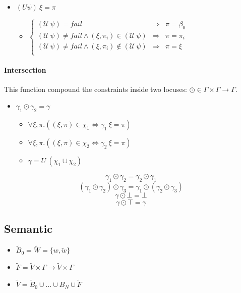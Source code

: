 \documentclass[a4paper]{report}
\newcommand{\locus}[1]{\widetilde{#1}}
\begin{document}
\begin{itemize}
\item $(U \psi)\ \xi = \pi$
	\begin{itemize}
	\item $\left\{\begin{array}{ccl}
	 	(\mathcal U\ \psi) = fail & \Rightarrow& \pi =\beta_0\\
		(\mathcal U\ \psi)\neq fail \wedge (\xi,\pi_i)\in (\mathcal U\ \psi) &\Rightarrow& \pi = \pi_i\\
		(\mathcal U\ \psi)\neq fail \wedge (\xi,\pi_i)\notin(\mathcal U\ \psi) &\Rightarrow&\pi = \xi\\
		\end{array}\right.$
	\end{itemize}
\end{itemize}

\paragraph{Intersection} This function compound the constraints inside two locuses: $\odot\in\Gamma \times \Gamma \to \Gamma$.

\begin{itemize}
\item $\gamma_1\odot\gamma_2 = \gamma$
	\begin{itemize}
	\item $\forall \xi,\pi.((\xi,\pi)\in\chi_1\Leftrightarrow \gamma_1\ \xi=\pi)$
	\item $\forall \xi,\pi.((\xi,\pi)\in\chi_2\Leftrightarrow \gamma_2\ \xi=\pi)$
	\item $\gamma = U\ (\chi_1\cup\chi_2)$
	\end{itemize}
\end{itemize}

$$\gamma_1\odot \gamma_2 = \gamma_2\odot\gamma_1$$
$$(\gamma_1\odot\gamma_2)\odot\gamma_3=\gamma_1\odot (\gamma_2\odot\gamma_3)$$
$$\gamma\odot\bot=\bot$$
$$\gamma\odot\top=\gamma$$

\subsection{Semantic}

\begin{itemize}
\item $\locus B_0 = \locus W = \{w,\locus w\}$
\item $\locus F = \locus V \times \Gamma \to \locus V \times \Gamma$
\item $\locus V = \locus B_0 \cup \ldots \cup B_N \cup \locus F$
\end{itemize}
\end{document}
